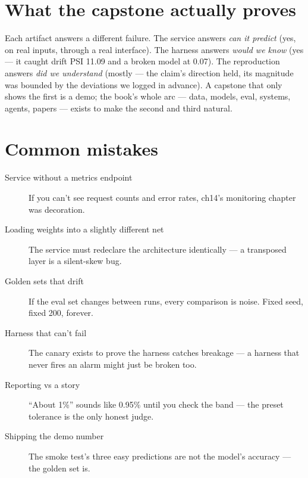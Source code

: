 \section{What the capstone actually proves}
\label{sec:capproof}

Each artifact answers a different failure. The service answers
\emph{can it predict} (yes, on real inputs, through a real
interface). The harness answers \emph{would we know} (yes --- it
caught drift PSI 11.09 and a broken model at 0.07). The reproduction
answers \emph{did we understand} (mostly --- the claim's direction
held, its magnitude was bounded by the deviations we logged in
advance). A capstone that only shows the first is a demo; the book's
whole arc --- data, models, eval, systems, agents, papers --- exists
to make the second and third natural.

\section{Common mistakes}
\label{sec:capmistakes}

\begin{description}
\item[Service without a metrics endpoint] If you can't see
request counts and error rates, ch14's monitoring chapter was
decoration.
\item[Loading weights into a slightly different net] The service
must redeclare the architecture identically --- a transposed layer
is a silent-skew bug.
\item[Golden sets that drift] If the eval set changes between runs,
every comparison is noise. Fixed seed, fixed 200, forever.
\item[Harness that can't fail] The canary exists to prove the
harness catches breakage --- a harness that never fires an alarm
might just be broken too.
\item[Reporting vs a story] ``About 1\%'' sounds like 0.95\% until
you check the band --- the preset tolerance is the only honest
judge.
\item[Shipping the demo number] The smoke test's three easy
predictions are not the model's accuracy --- the golden set is.
\end{description}

